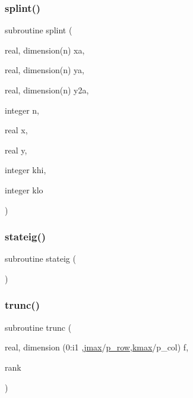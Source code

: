 \mbox{\label{main__comp_8f_acdf98afdf96c50e02807522a249b9a85}} 
\subsubsection{\texorpdfstring{splint()}{splint()}}
{\footnotesize\ttfamily subroutine splint (\begin{DoxyParamCaption}\item[{real, dimension(n)}]{xa,  }\item[{real, dimension(n)}]{ya,  }\item[{real, dimension(n)}]{y2a,  }\item[{integer}]{n,  }\item[{real}]{x,  }\item[{real}]{y,  }\item[{integer}]{khi,  }\item[{integer}]{klo }\end{DoxyParamCaption})}

\mbox{\label{main__comp_8f_a6c1fee4a0aa7778d40363e660983778a}} 
\subsubsection{\texorpdfstring{stateig()}{stateig()}}
{\footnotesize\ttfamily subroutine stateig (\begin{DoxyParamCaption}{ }\end{DoxyParamCaption})}

\mbox{\label{main__comp_8f_ac4190cdd366072ce20c098057d3c4791}} 
\subsubsection{\texorpdfstring{trunc()}{trunc()}}
{\footnotesize\ttfamily subroutine trunc (\begin{DoxyParamCaption}\item[{real, dimension   (0\+:i1          ,\hyperlink{param_8h_ac5c80d846ec0c4cf1c91fc5d9d66faa1}{jmax}/\hyperlink{param_8h_a149afb59990224def797b29467985bac}{p\+\_\+row},\hyperlink{param_8h_ae0453dd20a7c6a923904df942ef82468}{kmax}/p\+\_\+col)}]{f,  }\item[{}]{rank }\end{DoxyParamCaption})}

